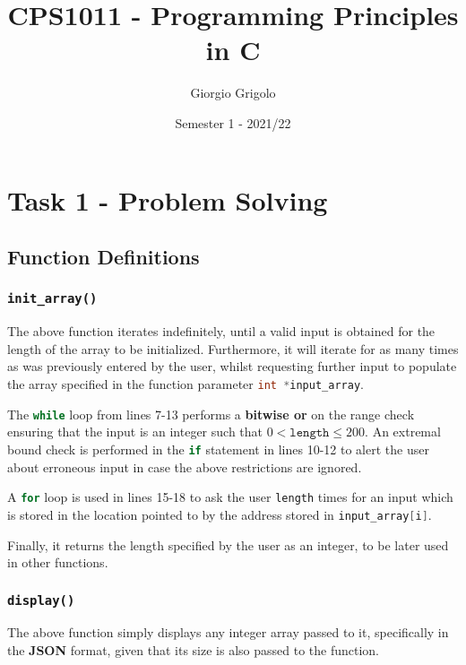 \documentclass{article}
\title{CPS1011 - Programming Principles in C}
\author{Giorgio Grigolo}
\date{Semester 1 - 2021/22}
\newcommand{\code}[1]{\lstinline[language=C]!#1!}
\begin{document}
\maketitle
\tableofcontents
\newpage

\section{Task 1 - Problem Solving}
\subsection{Function Definitions}
\subsubsection{\texttt{init\_array()}}
	


The above function iterates indefinitely, until a valid input is obtained for the length of the
array to be initialized. Furthermore, it will iterate for as many times as was previously entered
by the user, whilst requesting further input to populate the array specified in the function
parameter \code{int *input_array}.

The \code{while} loop from lines 7-13 performs a \textbf{bitwise or} on the
range check ensuring that the input is an integer such that $0 < \texttt{length} \leq 200$. An extremal bound check is performed in the \code{if} statement in lines 10-12 to alert the user
about erroneous input in case the above restrictions are ignored.

A \code{for} loop is used in lines 15-18 to ask the user \code{length} times for an input which is
stored in the location pointed to by the address stored in \code{input_array[i]}.

Finally, it returns the length specified by the user as an integer, to be later used in other functions.


\newpage
 
\subsubsection{\texttt{display()}}



The above function simply displays any integer array passed to it, specifically in the \textbf{JSON}
format, given that its size is also passed to the function. 
\end{document}
